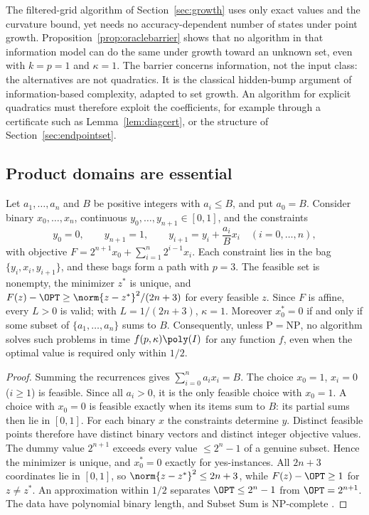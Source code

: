 The filtered-grid algorithm of Section~\ref{sec:growth} uses only exact values
and the curvature bound, yet needs no accuracy-dependent number of states under
point growth. Proposition~\ref{prop:oraclebarrier} shows that no algorithm in
that information model can do the same under growth toward an unknown set,
even with $k=p=1$ and $\kappa=1$. The barrier concerns information, not the
input class: the alternatives are not quadratics. It is the classical
hidden-bump argument of information-based complexity, adapted to set growth.
An algorithm for explicit quadratics must therefore exploit the coefficients,
for example through a certificate such as Lemma~\ref{lem:diagcert}, or the
structure of Section~\ref{sec:endpointset}.

\subsection{Product domains are essential}\label{sec:limits-constraints}

\begin{proposition}\label{lim:prop:constraints}
Let $a_1,\ldots,a_n$ and $B$ be positive integers with $a_i\le B$, and put
$a_0=B$. Consider binary $x_0,\ldots,x_n$, continuous
$y_0,\ldots,y_{n+1}\in[0,1]$, and the constraints
\[
y_0=0,\qquad y_{n+1}=1,\qquad y_{i+1}=y_i+\frac{a_i}Bx_i\quad(i=0,\ldots,n),
\]
with objective $F=2^{n+1}x_0+\sum_{i=1}^n2^{i-1}x_i$. Each constraint lies in
the bag $\{y_i,x_i,y_{i+1}\}$, and these bags form a path with $p=3$. The
feasible set is nonempty, the minimizer $z^*$ is unique, and
$F(z)-\OPT\ge\norm{z-z^*}^2/(2n+3)$ for every feasible $z$. Since $F$ is
affine, every $L>0$ is valid; with $L=1/(2n+3)$, $\kappa=1$. Moreover
$x_0^*=0$ if and only if some subset of $\{a_1,\ldots,a_n\}$ sums to $B$.
Consequently, unless $\mathrm P=\mathrm{NP}$, no algorithm solves such
problems in time $f(p,\kappa)\poly(I)$ for any function $f$, even when the
optimal value is required only within $1/2$.
\end{proposition}

\begin{proof}
Summing the recurrences gives $\sum_{i=0}^na_ix_i=B$. The choice $x_0=1$,
$x_i=0$ ($i\ge1$) is feasible. Since all $a_i>0$, it is the only feasible
choice with $x_0=1$. A choice with $x_0=0$ is feasible exactly when its
items sum to $B$: its partial sums then lie in $[0,1]$. For each binary $x$
the constraints determine $y$. Distinct feasible points therefore have
distinct binary vectors and distinct integer objective values. The dummy
value $2^{n+1}$ exceeds every value $\le2^n-1$ of a genuine subset. Hence
the minimizer is unique, and $x_0^*=0$ exactly for yes-instances. All
$2n+3$ coordinates lie in $[0,1]$, so $\norm{z-z^*}^2\le2n+3$, while
$F(z)-\OPT\ge1$ for $z\ne z^*$. An approximation within $1/2$ separates
$\OPT\le2^n-1$ from $\OPT=2^{n+1}$. The data have polynomial binary length,
and Subset Sum is NP-complete \cite{GareyJohnson1979}.
\end{proof}


